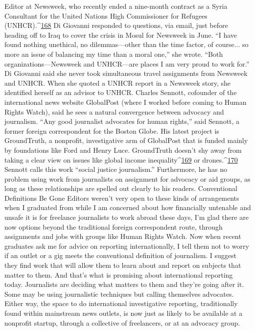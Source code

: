 Editor at Newsweek, who recently ended a nine-month contract as a Syria Consultant for
the United Nations High Commissioner for Refugees (UNHCR).^{\href{#endnotes}{168}}
Di Giovanni responded to questions, via email, just before heading off to Iraq to cover
the crisis in Mosul for Newsweek in June. ``I have found nothing unethical, no
dilemmas—other than the time factor, of course... so more an issue of balancing my time
than a moral one,'' she wrote. ``Both organizations—Newsweek and UNHCR—are places
I am very proud to work for.'' Di Giovanni said she never took simultaneous travel
assignments from Newsweek and UNHCR. When she quoted a UNHCR report in a
Newsweek story, she identified herself as an advisor to UNHCR.
Charles Sennott, cofounder of the international news website GlobalPost (where I worked
before coming to Human Rights Watch), said he sees a natural convergence between
advocacy and journalism. ``Any good journalist advocates for human rights,'' said
Sennott, a former foreign correspondent for the Boston Globe. His latest project is
GroundTruth, a nonprofit, investigative arm of GlobalPost that is funded mainly by
foundations like Ford and Henry Luce. GroundTruth doesn’t shy away from taking a
clear view on issues like global income inequality^{\href{#endnotes}{169}} or drones.^{\href{#endnotes}{170}} Sennott calls this work
``social justice journalism.'' Furthermore, he has no problem using work from journalists
on assignment for advocacy or aid groups, as long as these relationships are spelled out
clearly to his readers.
Conventional Definitions Be Gone
Editors weren’t very open to these kinds of arrangements when I graduated from
while I am concerned about how financially untenable and unsafe it is for freelance
journalists to work abroad these days, I’m glad there are now options beyond the
traditional foreign correspondent route, through assignments and jobs with groups like
Human Rights Watch.
Now when recent graduates ask me for advice on reporting internationally, I tell them not
to worry if an outlet or a gig meets the conventional definition of journalism. I suggest
they find work that will allow them to learn about and report on subjects that matter to
them. And that’s what is promising about international reporting today. Journalists are
deciding what matters to them and they’re going after it. Some may be using journalistic
techniques but calling themselves advocates. Either way, the space to do international
investigative reporting, traditionally found within mainstream news outlets, is now just as
likely to be available at a nonprofit startup, through a collective of freelancers, or at an
advocacy group.

